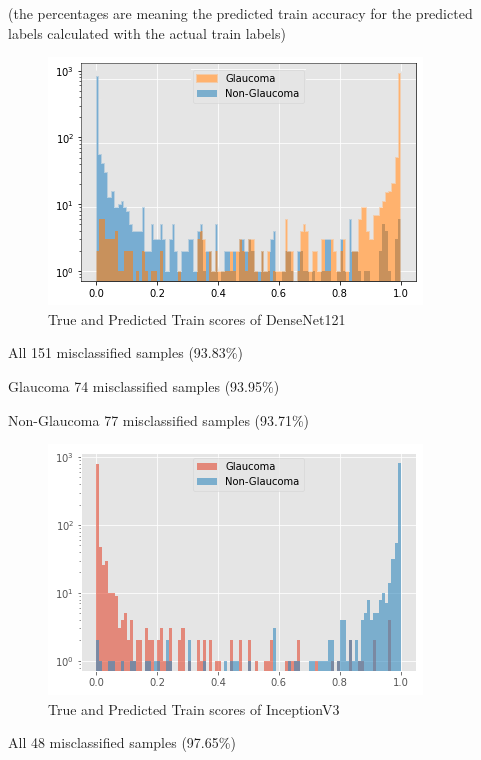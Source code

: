 \vspace{5mm}
(the percentages are meaning the predicted train accuracy for the predicted labels calculated with the actual train labels)

\vspace{5mm}
\begin{figure}[hbt!]
\centering
\includegraphics[scale=0.75]{images/fig-36.png}
\caption{True and Predicted Train scores of DenseNet121}
\label{fig:x True and Predicted Train scores of DenseNet121}
\end{figure}

All  151 misclassified samples (93.83\%) 

Glaucoma  74 misclassified samples (93.95\%)

Non-Glaucoma  77 misclassified samples (93.71\%)

\vspace{5mm}
\begin{figure}[hbt!]
\centering
\includegraphics[scale=0.75]{images/fig-37.png}
\caption{True and Predicted Train scores of InceptionV3}
\label{fig:x True and Predicted Train scores of InceptionV3}
\end{figure}

All   48 misclassified samples (97.65\%)

